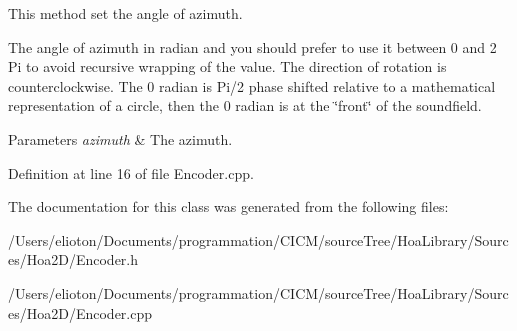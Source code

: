 This method set the angle of azimuth. 

The angle of azimuth in radian and you should prefer to use it between 0 and 2 Pi to avoid recursive wrapping of the value. The direction of rotation is counterclockwise. The 0 radian is Pi/2 phase shifted relative to a mathematical representation of a circle, then the 0 radian is at the \char`\"{}front\char`\"{} of the soundfield.


\begin{DoxyParams}{Parameters}
{\em azimuth} & The azimuth. \\
\hline
\end{DoxyParams}


Definition at line 16 of file Encoder.\-cpp.



The documentation for this class was generated from the following files\-:\begin{DoxyCompactItemize}
\item 
/\-Users/elioton/\-Documents/programmation/\-C\-I\-C\-M/source\-Tree/\-Hoa\-Library/\-Sources/\-Hoa2\-D/Encoder.\-h\item 
/\-Users/elioton/\-Documents/programmation/\-C\-I\-C\-M/source\-Tree/\-Hoa\-Library/\-Sources/\-Hoa2\-D/Encoder.\-cpp\end{DoxyCompactItemize}
